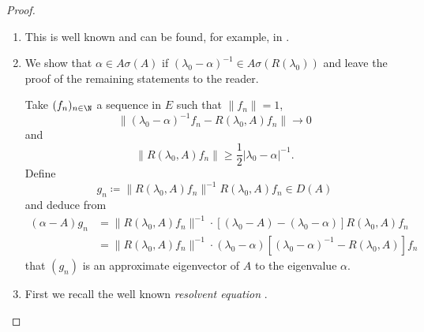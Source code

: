 \begin{proof}
\begin{enumerate}[\upshape (i), wide, labelindent=.25em]
\item 
This is well known and can be found, for example, in \textcite[VII.9.2]{dunfordschwartz:1958}.

\item 
We show that $\alpha \in A\sigma(A)$ if\/ $(\lambda_{0}-\alpha)^{-1} \in A\sigma(R(\lambda_{0}))$ and leave the proof of the remaining statements to the reader.

Take $(f_{n})_{n \in \N}$ a sequence in $E$ such that $\|f_{n}\| = 1$, 
%
\[
	\|(\lambda_{0}-\alpha)^{-1}f_{n} - R(\lambda_{0},A)f_{n}\| \to 0
\]
%
and 
%
\[
	\|R(\lambda_{0},A)f_{n}\| \geq \frac{1}{2}|\lambda_{0} - \alpha|^{-1} .
\]
%
Define
\[
g_{n} \coloneq \|R(\lambda_{0},A)f_{n}\|^{-1}R(\lambda_{0},A)f_{n} \in D(A)
\]
and deduce from
\begin{align*}
(\alpha-A)g_{n} &= \|R(\lambda_{0},A)f_{n}\|^{-1} \cdot 
		[(\lambda_{0}-A) - (\lambda_{0}-\alpha)]R(\lambda_{0},A)f_{n} \\  
	&= \|R(\lambda_{0},A)f_{n}\|^{-1} \cdot 			(\lambda_{0}-\alpha)[(\lambda_{0}-\alpha)^{-1} - R(\lambda_{0},A)]f_{n}
\end{align*}
that $(g_{n})$ is an approximate eigenvector of\/ $A$ to the eigenvalue $\alpha$.

\item 
First we recall the well known \emph{resolvent equation}
. 


\end{enumerate}
\end{proof}
